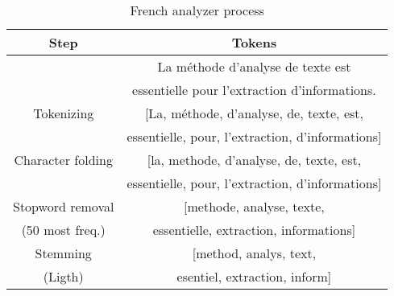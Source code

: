 \begin{table}[tbp]
    \caption{French analyzer process}
    \label{tab:french-analyzer}
    \centering
    \begin{tabular}{|c|c|}
        \toprule
        \textbf{Step} & \textbf{Tokens}\\
        \midrule
          & La méthode d'analyse de texte est\\ 
          & essentielle pour l'extraction d'informations.\\ 
         \midrule
         Tokenizing & [La, méthode, d'analyse, de, texte, est,\\
         & essentielle, pour, l'extraction, d'informations]\\
         \midrule
         Character folding & [la, methode, d'analyse, de, texte, est,\\
          & essentielle, pour, l'extraction, d'informations]\\
         \midrule
         Stopword removal & [methode, analyse, texte,\\
         (50 most freq.) & essentielle, extraction, informations]\\
         \midrule
         Stemming & [method, analys, text,\\
         (Ligth) & esentiel, extraction, inform]\\
        \bottomrule
    \end{tabular}
\end{table}